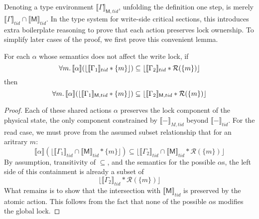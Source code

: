 Denoting a type environment $\llbracket\Gamma\rrbracket_{\mathsf{M},tid}$, unfolding the definition one step, is merely $\llbracket\Gamma\rrbracket_{tid}\cap\llbracket\mathsf{M}\rrbracket_{tid}$.  In the type system for write-side critical sections, this introduces extra boilerplate reasoning to prove that each action preserves lock ownership.  To simplify later cases of the proof, we first prove this convenient lemma.
\begin{lemma}
\label{lem:crit-liftingap}
For each $\alpha$ whose semantics does not affect the write lock, if
\[\forall m\ldotp   \llbracket \alpha \rrbracket  (\lfloor \llbracket \Gamma_{1} \rrbracket_{tid}  * \{m\} \rfloor )\subseteq  \lfloor \llbracket \Gamma_{2} \rrbracket_{tid} * \mathcal{R}(\{m\}) \rfloor\]
then
\[\forall m\ldotp   \llbracket \alpha \rrbracket  (\lfloor \llbracket \Gamma_{1} \rrbracket_{\textsf{M},tid}  * \{m\} \rfloor )\subseteq  \lfloor \llbracket \Gamma_{2} \rrbracket_{\textsf{M},tid} * \mathcal{R}(\{m\}) \rfloor\]
\end{lemma}
\begin{proof}
Each of these shared actions $\alpha$ preserves the lock  component of the physical state, the only component constrained by $\llbracket-\rrbracket_{M,tid}$ beyond $\llbracket-\rrbracket_{tid}$.
For the read case, we must prove from the assumed subset relationship that for an aritrary $m$:
\[\llbracket \alpha \rrbracket  (\lfloor \llbracket \Gamma_{1} \rrbracket_{tid}\cap\llbracket\textsf{M}\rrbracket_{tid}  * \{m\} \rfloor )\subseteq  \lfloor \llbracket \Gamma_{2} \rrbracket_{tid}\cap\llbracket\textsf{M}\rrbracket_{tid} * \mathcal{R}(\{m\}) \rfloor\]
By assumption, transitivity of $\subseteq$, and the semantics for the possible $\alpha$s,
the left side of this containment is already a subset of
\[\lfloor \llbracket \Gamma_{2} \rrbracket_{tid} * \mathcal{R}(\{m\}) \rfloor\]
What remains is to show that the intersection with $\llbracket\mathsf{M}\rrbracket_{tid}$ is preserved by the atomic action.
This follows from the fact that none of the possible $\alpha$s modifies the global lock.
\end{proof}
